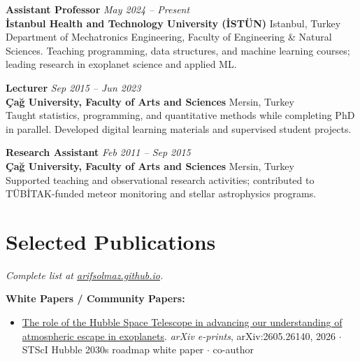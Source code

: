\documentclass[11pt,a4paper]{article}
\newcommand{\cventry}[4]{
  \vspace{4pt}
  \textbf{#1} \hfill \textit{#3} \\
  \textbf{\color{darkgray} #2} \hfill #4 \\
}
\begin{document}
\cventry{Assistant Professor}{İstanbul Health and Technology University (İSTÜN)}{May 2024 -- Present}{Istanbul, Turkey}
Department of Mechatronics Engineering, Faculty of Engineering \& Natural Sciences. Teaching programming, data structures, and machine learning courses; leading research in exoplanet science and applied ML.

\cventry{Lecturer}{Çağ University, Faculty of Arts and Sciences}{Sep 2015 -- Jun 2023}{Mersin, Turkey}
Taught statistics, programming, and quantitative methods while completing PhD in parallel. Developed digital learning materials and supervised student projects.

\cventry{Research Assistant}{Çağ University, Faculty of Arts and Sciences}{Feb 2011 -- Sep 2015}{Mersin, Turkey}
Supported teaching and observational research activities; contributed to TÜBİTAK-funded meteor monitoring and stellar astrophysics programs.

\section{Selected Publications}

\textit{Complete list at \href{https://arifsolmaz.github.io}{arifsolmaz.github.io}.}

\vspace{0.2em}
\textbf{White Papers / Community Papers:}
\begin{itemize}
\item \href{https://arxiv.org/abs/2605.26140}{The role of the Hubble Space Telescope in advancing our understanding of atmospheric escape in exoplanets}. 
\textit{arXiv e-prints}, arXiv:2605.26140, 2026 $\cdot$ STScI Hubble 2030s roadmap white paper $\cdot$ co-author
\end{itemize}
\end{document}
